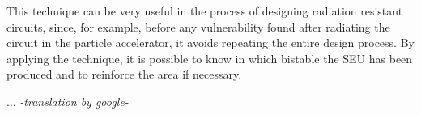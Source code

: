 This technique can be very useful in the process of designing radiation resistant 
circuits, since, for example, before any vulnerability found after radiating the 
circuit in the particle accelerator, it avoids repeating the entire design process.
By applying the technique, it is possible to know in which bistable the SEU has 
been produced and to reinforce the area if necessary.



...
\emph{-translation by google-}

